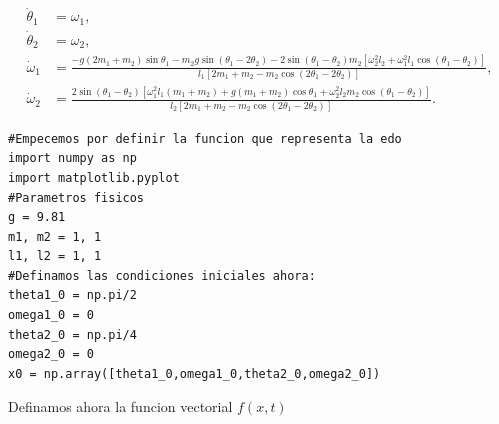 \documentclass[11pt,a4paper]{article}
\begin{document}
\begin{equation}
\begin{aligned}
\dot{\theta}_1 &= \omega_1, \\
\dot{\theta}_2 &= \omega_2, \\[0.5em]
\dot{\omega}_1 &=
\frac{
 -g (2m_1 + m_2)\sin\theta_1
 - m_2 g \sin(\theta_1 - 2\theta_2)
 - 2 \sin(\theta_1 - \theta_2) m_2
 \left[ \omega_2^2 l_2 + \omega_1^2 l_1 \cos(\theta_1 - \theta_2) \right]
}{
 l_1 \left[ 2m_1 + m_2 - m_2 \cos(2\theta_1 - 2\theta_2) \right]
}, \\[1em]
\dot{\omega}_2 &=
\frac{
 2 \sin(\theta_1 - \theta_2)
 \left[
  \omega_1^2 l_1 (m_1 + m_2)
  + g (m_1 + m_2)\cos\theta_1
  + \omega_2^2 l_2 m_2 \cos(\theta_1 - \theta_2)
 \right]
}{
 l_2 \left[ 2m_1 + m_2 - m_2 \cos(2\theta_1 - 2\theta_2) \right]
}.
\end{aligned}
\end{equation}




\begin{lstlisting}[caption={Edo pendulo doble}]
#Empecemos por definir la funcion que representa la edo 
import numpy as np
import matplotlib.pyplot
#Parametros fisicos
g = 9.81
m1, m2 = 1, 1
l1, l2 = 1, 1
#Definamos las condiciones iniciales ahora:
theta1_0 = np.pi/2
omega1_0 = 0
theta2_0 = np.pi/4
omega2_0 = 0
x0 = np.array([theta1_0,omega1_0,theta2_0,omega2_0])
\end{lstlisting}
\medskip

Definamos ahora la funcion vectorial $f(x,t)$
\end{document}
